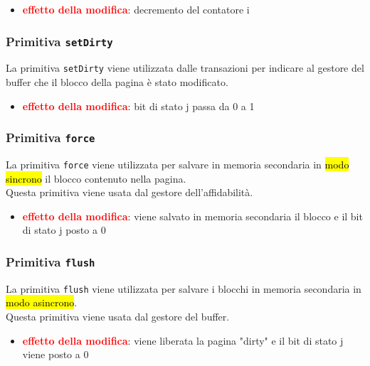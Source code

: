 \begin{itemize}[label=$\Rightarrow$]
  \item \textcolor{red}{\textbf{effetto della modifica}}: decremento del contatore $\mathrm{i}$
\end{itemize}

\subsubsection{Primitiva \protect\texttt{setDirty}}
La \textcolor{azzurrino}{primitiva \texttt{setDirty}} viene utilizzata dalle transazioni per indicare al gestore del buffer che il blocco della pagina è stato modificato.

\begin{itemize}[label=$\Rightarrow$]
  \item \textcolor{red}{\textbf{effetto della modifica}}: bit di stato $\mathrm{j}$ passa da 0 a 1
\end{itemize}

\subsubsection{Primitiva \protect\texttt{force}}
La \textcolor{azzurrino}{primitiva \texttt{force}} viene utilizzata per salvare in memoria secondaria in \hl{modo sincrono} il blocco contenuto nella pagina.\\[0.2ex]
Questa primitiva viene usata dal gestore dell'affidabilità.

\begin{itemize}[label=$\Rightarrow$]
  \item \textcolor{red}{\textbf{effetto della modifica}}: viene salvato in memoria secondaria il blocco e il bit di stato $\mathrm{j}$ posto a 0
\end{itemize}

\subsubsection{Primitiva \protect\texttt{flush}}
La \textcolor{azzurrino}{primitiva \texttt{flush}} viene utilizzata per salvare i blocchi in memoria secondaria in \hl{modo asincrono}.\\[0.2ex]
Questa primitiva viene usata dal gestore del buffer.

\begin{itemize}[label=$\Rightarrow$]
  \item \textcolor{red}{\textbf{effetto della modifica}}: viene liberata la pagina "dirty" e il bit di stato $\mathrm{j}$ viene posto a 0
\end{itemize}

